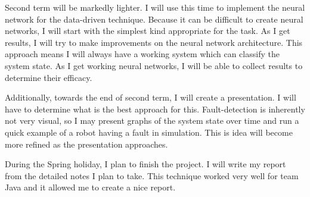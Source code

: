 \documentclass[10pt, a4paper]{article}
\begin{document}
Second term will be markedly lighter. I will use this time to
implement the neural network for the data-driven technique. Because it
can be difficult to create neural networks, I will start with the
simplest kind appropriate for the task. As I get results, I will try
to make improvements on the neural network architecture. This approach
means I will always have a working system which can classify the
system state. As I get working neural networks, I will be able to
collect results to determine their efficacy.

Additionally, towards the end of second term, I will create a
presentation. I will have to determine what is the best approach for
this. Fault-detection is inherently not very visual, so I may present
graphs of the system state over time and run a quick example of a
robot having a fault in simulation. This is idea will become more
refined as the presentation approaches.

During the Spring holiday, I plan to finish the project. I will write
my report from the detailed notes I plan to take. This technique
worked very well for team Java and it allowed me to create a nice
report.
\end{document}
